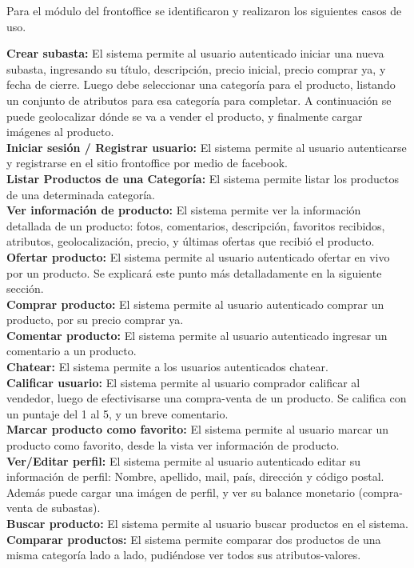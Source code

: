 \documentclass[journal]{IEEEtran}
\begin{document}
Para el módulo del frontoffice se identificaron y realizaron los siguientes casos de uso.

  \textbf{Crear subasta:} El sistema permite al usuario autenticado iniciar una nueva subasta, ingresando su título, descripción, precio inicial, precio comprar ya, y fecha de cierre. Luego debe seleccionar una categoría para el producto, listando un conjunto de atributos para esa categoría para completar. A continuación se puede geolocalizar dónde se va a vender el producto, y finalmente cargar imágenes al producto. 
  \\
  \textbf{Iniciar sesión / Registrar usuario:} El sistema permite al usuario autenticarse y registrarse en el sitio frontoffice por medio de facebook.
  \\
  \textbf{Listar Productos de una Categoría:} El sistema permite listar los productos de una determinada categoría.
  \\
  \textbf{Ver información de producto:} El sistema permite ver la información detallada de un producto: fotos, comentarios, descripción, favoritos recibidos, atributos, geolocalización, precio, y últimas ofertas que recibió el producto.
 \\
  \textbf{Ofertar producto:} El sistema permite al usuario autenticado ofertar en vivo por un producto. Se explicará este punto más detalladamente en la siguiente sección.
 \\
  \textbf{Comprar producto:} El sistema permite al usuario autenticado comprar un producto, por su precio comprar ya.
 \\
  \textbf{Comentar producto:} El sistema permite al usuario autenticado ingresar un comentario a un producto.
 \\
  \textbf{Chatear:} El sistema permite a los usuarios autenticados chatear.
 \\
  \textbf{Calificar usuario:} El sistema permite al usuario comprador calificar al vendedor, luego de efectivisarse una compra-venta de un producto. Se califica con un puntaje del 1 al 5, y un breve comentario. 
 \\
  \textbf{Marcar producto como favorito:} El sistema permite al usuario marcar un producto como favorito, desde la vista ver información de producto.
 \\
  \textbf{Ver/Editar perfil:} El sistema permite al usuario autenticado editar su información de perfil: Nombre, apellido, mail, país, dirección y código postal. Además puede cargar una imágen de perfil, y ver su balance monetario (compra-venta de subastas).
  \\
  \textbf{Buscar producto:} El sistema permite al usuario buscar productos en el sistema.
  \\
  \textbf{Comparar productos:} El sistema permite comparar dos productos de una misma categoría lado a lado, pudiéndose ver todos sus atributos-valores.
\end{document}
